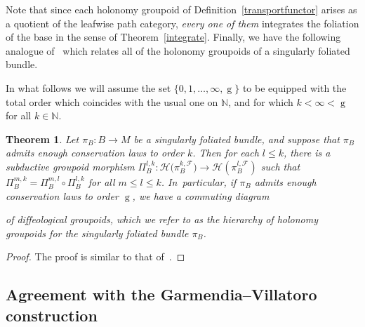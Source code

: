\documentclass[pdftex]{sigma}
\numberwithin{equation}{section}
\newtheorem{Theorem}{Theorem}[section]
\def\g{\operatorname{g}}
\def\FF{{\mathcal{F}}}
\def\HH{{\mathcal{H}}}
\def\NB{{\mathbb{N}}}
\begin{document}
Note that since each holonomy groupoid of Definition~\ref{transportfunctor} arises as a quotient of the leafwise path category, \textit{every one of them} integrates the foliation of the base in the sense of Theorem~\ref{integrate}. Finally, we have the following analogue of~\cite[Theorem~5.15]{mac3} which relates all of the holonomy groupoids of a singularly foliated bundle.

In what follows we will assume the set $\{0,1,\dots,\infty,\g\}$ to be equipped with the total order which coincides with the usual one on $\NB$, and for which $k<\infty<\g$ for all $k\in\NB$.

\begin{Theorem}\label{hierarchy}
Let $\pi_{B}\colon B\rightarrow M$ be a singularly foliated bundle, and suppose that $\pi_{B}$ admits enough conservation laws to order $k$. Then for each $l\leq k$, there is a subductive groupoid morphism $\Pi_{B}^{l,k}\colon \HH\big(\pi_{B}^{k,\FF}\big)\rightarrow\HH(\pi_{B}^{l,\FF})$ such that $\Pi_{B}^{m,k} = \Pi_{B}^{m,l}\circ\Pi_{B}^{l,k}$ for all $m\leq l\leq k$. In~particular, if $\pi_{B}$ admits enough conservation laws to order $\g$, we have a commuting diagram
\begin{center}
\end{center}
of diffeological groupoids, which we refer to as the \textit{hierarchy of holonomy groupoids} for the singularly foliated bundle $\pi_{B}$.
\end{Theorem}

\begin{proof}
The proof is similar to that of~\cite[Theorem~5.15]{mac3}.
\end{proof}

\subsection{Agreement with the Garmendia--Villatoro construction}
\end{document}
